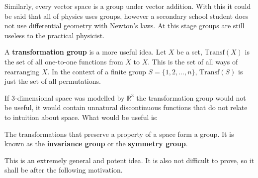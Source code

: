 \documentclass[floatfix,aps,prd,amsmath,amssymb]{revtex4}
\begin{document}
Similarly, every vector space is a group under vector addition. With this it could be said that all of physics uses groups, however a secondary school student does not use differential geometry with Newton's laws. At this stage groups are still useless to the practical physicist.

A \textbf{transformation group} is a more useful idea. Let $X$ be a set, $\mathrm{Transf}(X)$ is the set of all one-to-one functions from $X$ to $X$. This is the set of all ways of rearranging $X$. In the context of a finite group $S=\{1,2,...,n\}$, $\mathrm{Transf}(S)$ is just the set of all permutations. 

If $3$-dimensional space was modelled by $\mathbb{R}^3$ the transformation group would not be useful, it would contain unnatural discontinuous functions that do not relate to intuition about space. What would be useful is:
\begin{center}
The transformations that preserve a property of a space form a group. It is known as the \textbf{invariance group} or the \textbf{symmetry group}.
\end{center}
 This is an extremely general and potent idea. It is also not difficult to prove, so it shall be after the following motivation.
 
\end{document}
